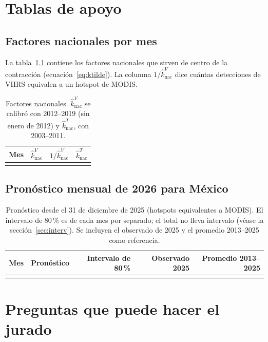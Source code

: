 \chapter{Tablas de apoyo}

\section{Factores nacionales por mes}

La tabla~\ref{tab:knat} contiene los factores nacionales que sirven de centro de la contracción (ecuación~\eqref{eq:ktilde}). La columna $1/\widehat k^{V}_{\mathrm{nac}}$ dice cuántas detecciones de VIIRS equivalen a un hotspot de MODIS.

\begin{table}[H]
\centering
\caption{Factores nacionales. $\widehat k^{V}_{\mathrm{nac}}$ se calibró con 2012--2019 (sin enero de 2012) y $\widehat k^{T}_{\mathrm{nac}}$, con 2003--2011.}\label{tab:knat}
\small
\begin{tabular}{@{}lrrr@{}}
\toprule
Mes & $\widehat k^{V}_{\mathrm{nac}}$ & $1/\widehat k^{V}_{\mathrm{nac}}$ & $\widehat k^{T}_{\mathrm{nac}}$ \\
\midrule

\\
\bottomrule
\end{tabular}
\end{table}

\section{Pronóstico mensual de 2026 para México}

\begin{table}[H]
\centering
\caption{Pronóstico desde el 31 de diciembre de 2025 (hotspots equivalentes a MODIS). El intervalo de $80\,\%$ es de cada mes por separado; el total no lleva intervalo (véase la sección~\ref{sec:interv}). Se incluyen el observado de 2025 y el promedio 2013--2025 como referencia.}\label{tab:pron2026}
\small
\begin{tabular}{@{}lrrrr@{}}
\toprule
Mes & Pronóstico & Intervalo de 80\,\% & Observado 2025 & Promedio 2013--2025 \\
\midrule

\\
\bottomrule
\end{tabular}
\end{table}

\chapter{Preguntas que puede hacer el jurado}

